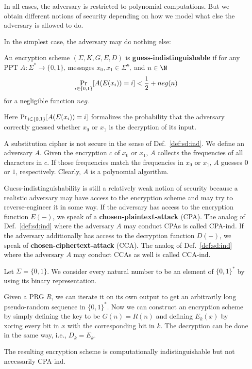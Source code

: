 In all cases, the adversary is restricted to polynomial computations.
But we obtain different notions of security depending on how we model what else the adversary is allowed to do.

In the simplest case, the adversary may do nothing else:

\begin{definition}\label{def:sd:ind}
  An encryption scheme $(\Sigma,K,G,E,D)$ is \textbf{guess-indistinguishable} if for any PPT $A:\Sigma^*\to\{0,1\}$, messages $x_0,x_1\in\Sigma^n$, and $n\in \N$
  \[\mathop{\mathrm{Pr}}_{i\in\{0,1\}}[A(E(x_i))=i]<\frac{1}{2}+neg(n)\]
  for a negligible function $neg$.
\end{definition}

Here $\mathop{\mathrm{Pr}}_{i\in\{0,1\}}[A(E(x_i))=i]$ formalizes the probability that the adversary correctly guessed whether $x_0$ or $x_1$ is the decryption of its input.

\begin{example}
A substitution cipher is not secure in the sense of Def.~\ref{def:sd:ind}.
We define an adversary $A$.
Given the encryption $c$ of $x_0$ or $x_1$, $A$ collects the frequencies of all characters in $c$.
If those frequencies match the frequencies in $x_0$ or $x_1$, $A$ guesses $0$ or $1$, respectively.
Clearly, $A$ is a polynomial algorithm.
\end{example}

Guess-indistinguishability is still a relatively weak notion of security because a realistic adversary may have access to the encryption scheme and may try to reverse-engineer it in some way.
If the adversary has access to the encryption function $E(-)$, we speak of a \textbf{chosen-plaintext-attack} (CPA).
The analog of Def.~\ref{def:sd:ind} where the adversary $A$ may conduct CPAs is called CPA-ind.
If the adversary additionally has access to the decryption function $D(-)$, we speak of \textbf{chosen-ciphertext-attack} (CCA).
The analog of Def.~\ref{def:sd:ind} where the adversary $A$ may conduct CCAs as well is called CCA-ind.

\begin{example}
Let $\Sigma=\{0,1\}$.
We consider every natural number to be an element of $\{0,1\}^*$ by using its binary representation.

Given a PRG $R$, we can iterate it on its own output to get an arbitrarily long pseudo-random sequence in $\{0,1\}^*$.
Now we can construct an encryption scheme by simply defining the key to be $G(n)=R(n)$ and defining $E_k(x)$ by xoring every bit in $x$ with the corresponding bit in $k$.
The decryption can be done in the same way, i.e., $D_k=E_k$.

The resulting encryption scheme is computationally indistinguishable but not necessarily CPA-ind.
\end{example}


